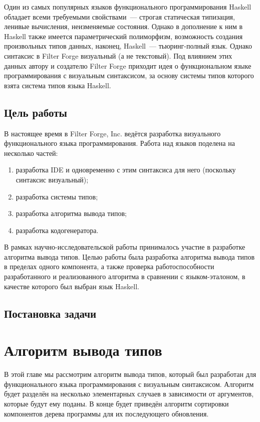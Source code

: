 Один из самых популярных языков функционального программирования Haskell обладает всеми требуемыми свойствами~--- строгая статическая типизация, ленивые вычисления, неизменяемые состояния. Однако в дополнение к ним в Haskell также имеется параметрический полиморфизм, возможность создания произвольных типов данных, наконец, Haskell~--- тьюринг-полный язык. Однако синтаксис в Filter Forge визуальный (а не текстовый). Под влиянием этих данных автору и создателю Filter Forge приходит идея о функциональном языке программирования с визуальным синтаксисом, за основу  системы типов которого взята система типов языка Haskell.

\section*{Цель работы}
В настоящее время в Filter Forge, Inc. ведётся разработка визуального функционального языка программирования. Работа над языков поделена на несколько частей:
 \begin{enumerate}[1)]
 	\item разработка IDE и одновременно с этим синтаксиса для него (поскольку синтаксис визуальный);
 	\item разработка системы типов;
 	\item разработка алгоритма вывода типов;
 	\item разработка кодогенератора.
 \end{enumerate} 

В рамках научно-исследовательской работы принималось участие в разработке алгоритма вывода типов. Целью работы была разработка алгоритма вывода типов в пределах одного компонента, а также проверка работоспособности разработанного и реализованного алгоритма в сравнении с языком-эталоном, в качестве которого был выбран язык Haskell.
\section*{Постановка задачи}

\chapter{Алгоритм вывода типов}\label{type_inf}
В этой главе мы рассмотрим алгоритм вывода типов, который был разработан для функционального языка программирования с визуальным синтаксисом. Алгоритм будет разделён на несколько элементарных случаев в зависимости от аргументов, которые будут ему поданы. В конце будет приведён алгоритм сортировки компонентов дерева программы для их последующего обновления. 
